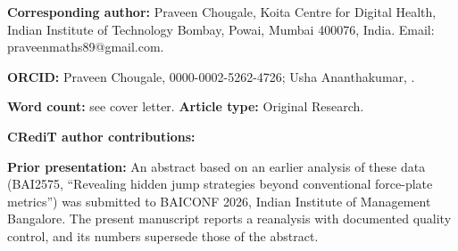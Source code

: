 \documentclass[]{interact}
\begin{document}


\maketitle
\noindent\textbf{Corresponding author:} Praveen Chougale, Koita Centre for Digital Health, Indian Institute of Technology Bombay, Powai, Mumbai 400076, India. Email: praveenmaths89@gmail.com.

\noindent\textbf{ORCID:} Praveen Chougale, 0000-0002-5262-4726; Usha Ananthakumar, .

\noindent\textbf{Word count:} see cover letter. \textbf{Article type:} Original Research.

\noindent\textbf{CRediT author contributions:} 

\noindent\textbf{Prior presentation:} An abstract based on an earlier analysis of these data (BAI2575, ``Revealing hidden jump strategies beyond conventional force-plate metrics'') was submitted to BAICONF 2026, Indian Institute of Management Bangalore. The present manuscript reports a reanalysis with documented quality control, and its numbers supersede those of the abstract. 
\end{document}

